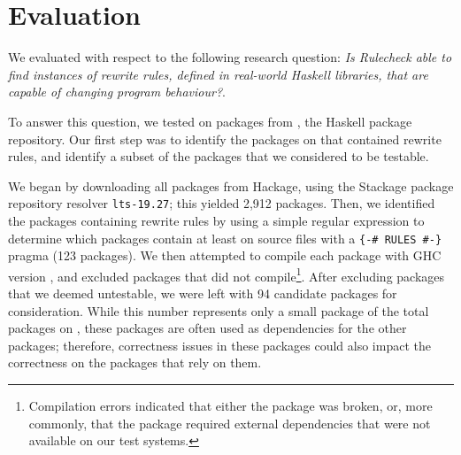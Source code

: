 \section{Evaluation}
\label{sec:evaluation}
{

We evaluated \Rulecheck with respect to the following research question:
\textit{Is Rulecheck able to find instances of rewrite rules, defined in
real-world Haskell libraries, that are capable of changing program behaviour?}.

To answer this question, we tested \Rulecheck on packages from
\Hackage, the Haskell package repository. Our first step was to identify the
packages on \Hackage that contained rewrite rules, and identify a subset of the
packages that we considered to be testable.

\newcommand{\totalpackages}{2,912\xspace}  %
\newcommand{\rulespackages}{123\xspace}    %
\newcommand{\candidatepackages}{94\xspace} %

We began by downloading all packages from Hackage, using the Stackage package
repository resolver \texttt{lts-19.27}; this yielded \totalpackages packages.
Then, we identified the packages containing rewrite rules by using a simple
regular expression to determine which packages contain at least on source files
with a \texttt{\{-\# RULES \#-\}} pragma (\rulespackages packages). We then
attempted to compile each package with GHC version \rcghcver, and excluded
packages that did not compile\footnote{Compilation errors indicated that either
the package was broken, or, more commonly, that the package required external
dependencies that were not available on our test systems.}. After excluding
packages that we deemed untestable, we were left with \candidatepackages
candidate packages for consideration. While this number represents only a small
package of the total packages on \Hackage, these packages are often used as
dependencies for the other packages; therefore, correctness issues in these
packages could also impact the correctness on the packages that rely on
them.

}
